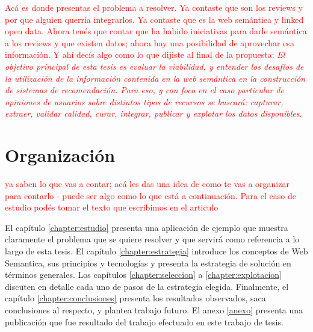 \begin{framed}
\textcolor{red}{Acá es donde presentas el problema a resolver. Ya contaste que son los reviews y por que alguien querría integrarlos. Ya contaste que es la web semántica y linked open data. Ahora tenés que contar que ha habido iniciativas para darle semántica a los reviews y que existen datos; ahora hay una posibilidad de aprovechar esa información. Y ahí decís algo como lo que dijiste al final de la propuesta: \textit{El objetivo principal de esta tesis es evaluar la viabilidad, y entender los desafíos de la utilización de la información contenida en la web semántica en la construcción de sistemas de recomendación. Para eso, y con foco en el caso particular de opiniones de usuarios sobre distintos tipos de recursos se buscará: capturar, extraer, validar calidad, curar, integrar, publicar y explotar los datos disponibles}.}
\end{framed}

\section{Organización}
\label{section:organizacion}

\begin{framed}
\textcolor{red}{ya saben lo que vas a contar; acá les das una idea de como te vas a organizar para contarlo - puede ser algo como lo que está a continuación. Para el caso de estudio podés tomar el texto que escribimos en el articulo}
\end{framed}

El capítulo \ref{chapter:estudio} presenta una aplicación de ejemplo que muestra claramente el problema que se quiere resolver y que servirá como referencia a lo largo de esta tesis. El capítulo \ref{chapter:estrategia} introduce los conceptos de Web Semantica, sus principios y tecnologías y presenta la estrategia de solución en términos generales. Los capítulos \ref{chapter:seleccion} a \ref{chapter:explotacion} discuten en detalle cada uno de pasos de la estrategia elegida. Finalmente, el capítulo \ref{chapter:conclusiones} presenta los resultados observados, saca conclusiones al respecto, y plantea trabajo futuro. El anexo \ref{anexo} presenta una publicación que fue resultado del trabajo efectuado en este trabajo de tesis. 




